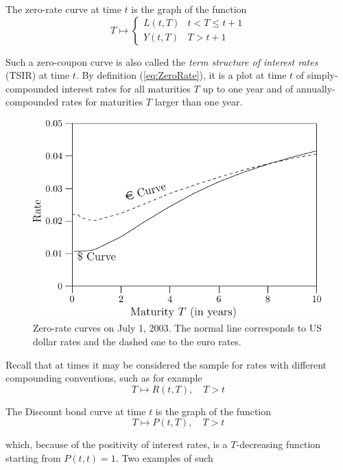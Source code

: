\begin{defn} The zero-rate curve at time $t$ is the
  graph of the function 
\begin{equation}
\label{eq:ZeroRate}
T \mapsto \left\{ 
\begin{array}{ll}
L(t,T) & t<T\leq t+1\\
Y(t,T) & T>t+1
\end{array}
\right.
\end{equation}
\end{defn}
Such a zero-coupon curve is also called the {\sl term structure of
  interest rates} (TSIR) at time $t$. By definition
(\ref{eq:ZeroRate}), it is a plot at time $t$ of simply-compounded
interest rates for all maturities $T$ up to one year and of
annually-compounded rates for maturities $T$ larger than one year.  
\begin{figure}[!h]
\centering
\includegraphics{Ch1Figure1.pdf}
\caption{Zero-rate curves on July 1, 2003. The normal line
  corresponds to US dollar rates and the dashed one to the euro
  rates.\label{fig:ZRCurves}}
\end{figure}
Recall that at times it may be considered the sample for rates with
different compounding conventions, such as for example  
$$
T \mapsto R(t,T), \quad T>t
$$
\begin{defn} The Discount bond curve at time $t$
  is the graph of the function 
\begin{equation}
\label{eq:ZeroBond}
T \mapsto P(t,T),\quad T>t
\end{equation}
\end{defn}
which, because of the positivity of interest rates, is a
$T$-decreasing function starting from $P(t,t)=1$. Two examples of such
